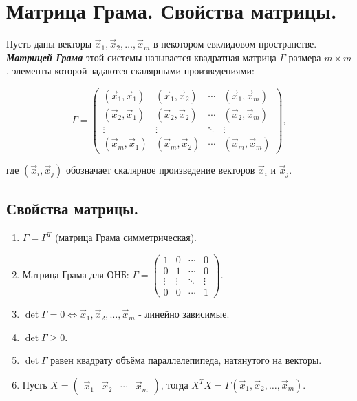 \section{
    Матрица Грама. Свойства матрицы.
}

\begin{definition}
    Пусть даны векторы \( \vec{x}_1, \vec{x}_2, \dots, \vec{x}_m \) в некотором евклидовом пространстве. \textit{\textbf{Матрицей Грама}} этой системы называется квадратная матрица \( \Gamma \) размера \( m \times m \), элементы которой задаются скалярными произведениями:

    \[
    \Gamma = \begin{pmatrix}
    (\vec{x}_1, \vec{x}_1) & (\vec{x}_1, \vec{x}_2) & \cdots & (\vec{x}_1, \vec{x}_m) \\
    (\vec{x}_2, \vec{x}_1) & (\vec{x}_2, \vec{x}_2) & \cdots & (\vec{x}_2, \vec{x}_m) \\
    \vdots     & \vdots     & \ddots & \vdots     \\
    (\vec{x}_m, \vec{x}_1) & (\vec{x}_m, \vec{x}_2) & \cdots & (\vec{x}_m, \vec{x}_m)
    \end{pmatrix},
    \]
    
    где \( (\vec{x}_i, \vec{x}_j) \) обозначает скалярное произведение векторов \( \vec{x}_i \) и \( \vec{x}_j \).
\end{definition}


\subsection*{Свойства матрицы.}

\begin{enumerate}[label={\arabic*°.}]
    \item $\Gamma = \Gamma^T$ (матрица Грама симметрическая).
    \item Матрица Грама для ОНБ: $\Gamma = \begin{pmatrix}
    1 & 0 & \cdots & 0 \\
    0 & 1 & \cdots & 0 \\
    \vdots     & \vdots     & \ddots & \vdots     \\
    0 & 0 & \cdots & 1
    \end{pmatrix}$.

    \item $\det \Gamma = 0 \iff \vec{x}_1, \vec{x}_2, \dots, \vec{x}_m$ - линейно зависимые.
    \item $\det \Gamma \geq 0$.
    \item $\det \Gamma$ равен квадрату объёма параллелепипеда, натянутого на векторы.
    \item Пусть $X = \begin{pmatrix}
    \vec{x}_1 & \vec{x}_2 & \cdots & \vec{x}_m
    \end{pmatrix}$, тогда $X^TX = \Gamma(\vec{x}_1, \vec{x}_2, \ldots, \vec{x}_m).$
\end{enumerate}
